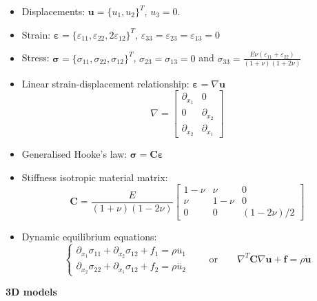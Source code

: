 \documentclass[12pt]{article}
\begin{document}
\begin{itemize}
      \item Displacements: $\mathbf u =\{u_{1}, u_{2}\}^T$, $u_3=0$.
      \item Strain:  $\boldsymbol\varepsilon =\{\varepsilon_{11}, \varepsilon_{22}, 2\varepsilon_{12}\}^T$, $\varepsilon_{33}=\varepsilon_{23}=\varepsilon_{13}=0$
      \item Stress: $\boldsymbol\sigma =\{\sigma_{11}, \sigma_{22}, \sigma_{12}\}^T$, $\sigma_{23}=\sigma_{13}=0$ and $\sigma_{33}=\frac{E\nu(\varepsilon_{11}+\varepsilon_{22})}{(1+\nu)(1+2\nu)}$
      \item Linear strain-displacement relationship: $\boldsymbol\varepsilon=\nabla\mathbf u$
            $$\nabla=\begin{bmatrix} \partial_{x_1} & 0 \\ 0 & \partial_{x_2} \\ \partial_{x_2} & \partial_{x_1}  \end{bmatrix}$$
      \item Generalised Hooke’s law: $\boldsymbol\sigma=\mathbf C\boldsymbol\varepsilon$
      \item Stiffness isotropic material matrix:
            $$\mathbf C=\frac{E}{(1+\nu)(1-2\nu)}\begin{bmatrix} 1-\nu & \nu & 0 \\ \nu & 1-\nu& 0 \\ 0 & 0 & (1-2\nu)/2 \end{bmatrix}$$
      \item Dynamic equilibrium equations:
            $$ \begin{cases}
                        \partial_{x_1}\sigma_{11} + \partial_{x_2}\sigma_{12}  + f_1 = \rho \ddot{u_{1}} \\
                        \partial_{x_2}\sigma_{22} + \partial_{x_1}\sigma_{12}  + f_2 = \rho \ddot{u_{2}}
                  \end{cases}
                  \qquad \text{or}\qquad \nabla^T\mathbf C\nabla\mathbf u + \mathbf f = \rho \ddot{\mathbf u}$$
\end{itemize}

\hrulefill
\vspace{0.3cm}

\hspace*{\fill}\textbf{\Large 3D models}\hspace*{\fill}

\hrulefill
\end{document}
